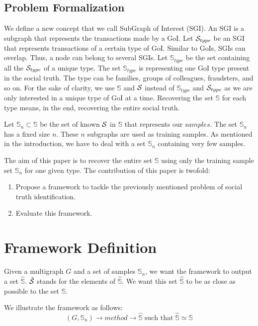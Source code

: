 \documentclass{llncs}
\begin{document}
\subsection{Problem Formalization}\label{sec:problem_formalization}
We define a new concept that we call SubGraph of Interest (SGI).
An SGI is a subgraph that represents the transactions made by a GoI.
Let \({\cal{S}}_{type}\) be an SGI that represents transactions of a certain type of GoI.
Similar to GoIs, SGIs can overlap.
Thus, a node can belong to several SGIs.
Let \(\mathbb{S}_{type}\) be the set containing all the \({\cal{S}}_{type}\) of a unique type.
The set \(\mathbb{S}_{type}\) is representing one GoI type present in the social truth.
The type can be families, groups of colleagues, fraudsters, and so on.
For the sake of clarity, we use \(\mathbb{S}\) and \({\cal{S}}\) instead of \(\mathbb{S}_{type}\) and \({\cal{S}}_{type}\) as we are only interested in a unique type of GoI at a time.
Recovering the set \(\mathbb{S}\) for each type means, in the end, recovering the entire social truth.

Let \(\mathbb{S}_n \subset \mathbb{S}\) be the set of known \({\cal{S}}\) in \(\mathbb{S}\) that represents our \(samples\).
The set \(\mathbb{S}_n\) has a fixed size \(n\).
These \(n\) subgraphs are used as training samples.
As mentioned in the introduction, we have to deal with a set \(\mathbb{S}_n\) containing very few samples.

The aim of this paper is to recover the entire set \(\mathbb{S}\) using only the training sample set \(\mathbb{S}_n\) for one given type.
The contribution of this paper is twofold:
\begin{enumerate}
\item Propose a framework to tackle the previously mentioned problem of social truth identification.
\item Evaluate this framework.
\end{enumerate}

\section{Framework Definition}\label{sec:framework_definition}
Given a multigraph \(G\) and a set of samples \(\mathbb{S}_n\), we want the framework to output a set \(\hat{\mathbb{S}}\).
\(\hat{\cal{S}}\) stands for the elements of \(\hat{\mathbb{S}}\).
We want this set \(\hat{\mathbb{S}}\) to be as close as possible to the set \(\mathbb{S}\).

We illustrate the framework as follows:
\begin{equation}
(G,\mathbb{S}_n)
\to
\boxed{{method}}
\to \hat{\mathbb{S}}
\;\text{such that}\;
\hat{\mathbb{S}}
\simeq
\mathbb{S}
\label{eq:framework}
\end{equation}
\end{document}
